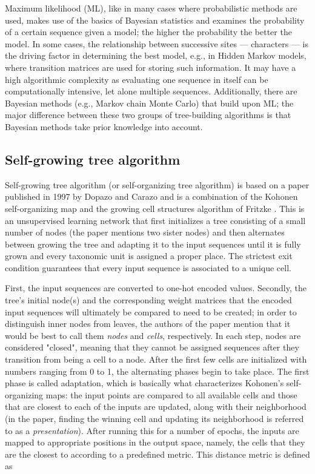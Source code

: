 \documentclass[11pt,twocolumn]{article}
\begin{document}
Maximum likelihood (ML), like in many cases where probabilistic methods are used, makes use of the basics of Bayesian statistics and examines the probability of a certain sequence given a model; the higher the probability the better the model. In some cases, the relationship between successive sites — characters — is the driving factor in determining the best model, e.g., in Hidden Markov models, where transition matrices are used for storing such information. It may have a high algorithmic complexity as evaluating one sequence in itself can be computationally intensive, let alone multiple sequences. Additionally, there are Bayesian methods (e.g., Markov chain Monte Carlo) that build upon ML; the major difference between these two groups of tree-building algorithms is that Bayesian methods take prior knowledge into account.

\subsection{Self-growing tree algorithm}

Self-growing tree algorithm (or self-organizing tree algorithm) is based on a paper published in 1997 by Dopazo and Carazo \cite{Dopazo1997} and is a combination of the Kohonen self-organizing map \cite{58325} and the growing cell structures algorithm of Fritzke \cite{Fritzke1994}. This is an unsupervised learning network that first initializes a tree consisting of a small number of nodes (the paper mentions two sister nodes) and then alternates between growing the tree and adapting it to the input sequences until it is fully grown and every taxonomic unit is assigned a proper place. The strictest exit condition guarantees that every input sequence is associated to a unique cell.

First, the input sequences are converted to one-hot encoded values. Secondly, the tree's initial node(s) and the corresponding weight matrices that the encoded input sequences will ultimately be compared to need to be created; in order to distinguish inner nodes from leaves, the authors of the paper mention that it would be best to call them \textit{nodes} and \textit{cells}, respectively. In each step, nodes are considered "closed", meaning that they cannot be assigned sequences after they transition from being a cell to a node. After the first few cells are initialized with numbers ranging from 0 to 1, the alternating phases begin to take place. The first phase is called adaptation, which is basically what characterizes Kohonen's self-organizing maps: the input points are compared to all available cells and those that are closest to each of the inputs are updated, along with their neighborhood (in the paper, finding the winning cell and updating its neighborhood is referred to as a \textit{presentation}). After running this for a number of epochs, the inputs are mapped to appropriate positions in the output space, namely, the cells that they are the closest to according to a predefined metric. This distance metric is defined as
\end{document}
